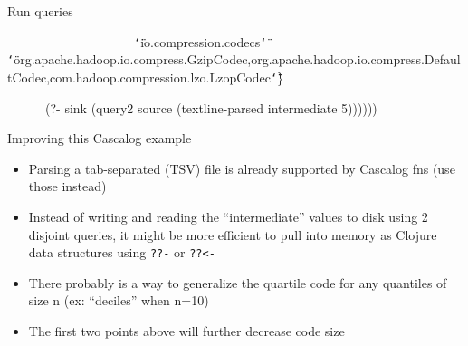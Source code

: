 \documentclass{beamer}
\renewcommand{\textquotedbl}{\texttt{\char`\"}}
\begin{document}
\begin{frame}{Run queries}
\begin{small}
{\ttfamily\color{black}
\ \ \ \ \ \ \ \ \ \ \ \ \ \ \ \ \ \ \ \ \textcolor[rgb]{0.54509807,0.13333334,0.32156864}{{\textquotedbl}io.compression.codecs{\textquotedbl}}
\textcolor[rgb]{0.54509807,0.13333334,0.32156864}{{\textquotedbl}org.apache.hadoop.io.compress.GzipCodec,org.apache.hadoop.io.compress.DefaultCodec,com.hadoop.compression.lzo.LzopCodec{\textquotedbl}}\}}

{\ttfamily\color{black}
\ \ \ \ \ \ \textcolor[rgb]{0.54901963,0.54901963,0.54901963}{(}?- sink
\textcolor[rgb]{0.54901963,0.54901963,0.54901963}{(}query2 source
\textcolor[rgb]{0.54901963,0.54901963,0.54901963}{(}textline-parsed
intermediate
5\textcolor[rgb]{0.54901963,0.54901963,0.54901963}{))))))}}
\end{small}
\end{frame}

\begin{frame}{Improving this Cascalog example}
  \begin{itemize}
  \item Parsing a tab-separated (TSV) file is already supported by
    Cascalog fns (use those instead)
  \item Instead of writing and reading the ``intermediate'' values to
    disk using 2 disjoint queries, it might be more efficient to pull into memory as Clojure
    data structures using \texttt{??-} or \texttt{??<-}
  \item There probably is a way to generalize the quartile code for
    any quantiles of size n (ex: ``deciles'' when n=10)
  \item The first two points above will further decrease code size
  \end{itemize}
\end{frame}
\end{document}
